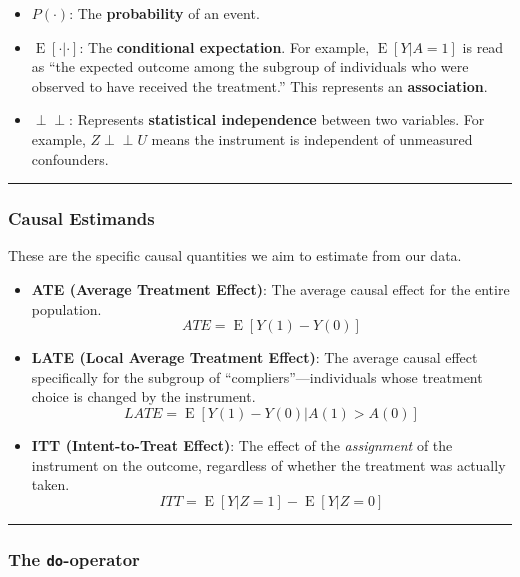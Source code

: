 \documentclass[
  letterpaper,
  DIV=11,
  numbers=noendperiod]{scrartcl}
\providecommand{\tightlist}{%
  \setlength{\itemsep}{0pt}\setlength{\parskip}{0pt}}
\begin{document}
\begin{itemize}
\tightlist
\item
  \textbf{\(P(\cdot)\)}: The \textbf{probability} of an event.
\item
  \textbf{\(\operatorname{E}[\cdot|\cdot]\)}: The \textbf{conditional
  expectation}. For example, \(\operatorname{E}[Y|A=1]\) is read as
  ``the expected outcome among the subgroup of individuals who were
  observed to have received the treatment.'' This represents an
  \textbf{association}.
\item
  \textbf{\(\perp\!\!\!\perp\)}: Represents \textbf{statistical
  independence} between two variables. For example,
  \(Z \perp\!\!\!\perp U\) means the instrument is independent of
  unmeasured confounders.
\end{itemize}

\begin{center}\rule{0.5\linewidth}{0.5pt}\end{center}

\subsubsection{Causal Estimands}\label{causal-estimands}

These are the specific causal quantities we aim to estimate from our
data.

\begin{itemize}
\tightlist
\item
  \textbf{ATE (Average Treatment Effect)}: The average causal effect for
  the entire population. \[ATE = \operatorname{E}[Y(1) - Y(0)]\]
\item
  \textbf{LATE (Local Average Treatment Effect)}: The average causal
  effect specifically for the subgroup of ``compliers''---individuals
  whose treatment choice is changed by the instrument.
  \[LATE = \operatorname{E}[Y(1) - Y(0) | A(1) > A(0)]\]
\item
  \textbf{ITT (Intent-to-Treat Effect)}: The effect of the
  \emph{assignment} of the instrument on the outcome, regardless of
  whether the treatment was actually taken.
  \[ITT = \operatorname{E}[Y|Z=1] - \operatorname{E}[Y|Z=0]\]
\end{itemize}

\begin{center}\rule{0.5\linewidth}{0.5pt}\end{center}

\subsubsection{\texorpdfstring{The
\texttt{do}-operator}{The do-operator}}\label{the-do-operator}
\end{document}
